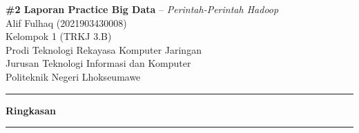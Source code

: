 \documentclass[a4paper,12pt]{article}
\renewenvironment{abstract}				%
 {\par\noindent\textbf{Ringkasan}\ \ignorespaces \\}
 {\par\noindent\medskip}
\begin{document}
\pagestyle{fancy}
\thispagestyle{empty}
\fancyhead[L]{}
\renewcommand*{\thefootnote}{\fnsymbol{footnote}}

\begin{center}
\Large{\textbf{\#2 Laporan Practice Big Data} -- \textit{Perintah-Perintah Hadoop}}
\vspace{0.4cm}
\normalsize \\ 
Alif Fulhaq (2021903430008) \\
Kelompok 1 (TRKJ 3.B) \\
\vspace{0.1cm}
\small{Prodi Teknologi Rekayasa Komputer Jaringan} \\
\small{Jurusan Teknologi Informasi dan Komputer} \\
\small{Politeknik Negeri Lhokseumawe}
\medskip
\normalsize
\end{center}

{\color{gray}\hrule}
\vspace{0.4cm}
\begin{abstract} 								%

\end{abstract}
{\color{gray}\hrule}
\medskip

\end{document}
